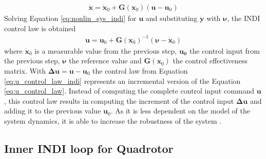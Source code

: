\documentclass[11pt, a4paper, twoside]{report}
\begin{document}
\begin{equation}
	\begin{split}
		\bm{\dot{x}} = \bm{\dot{x}}_0 + \bm{G}(\bm{x}_0) (\bm{u}-\bm{u}_0) 
		\label{eq:nonlin_sys_indi}
	\end{split}
\end{equation}
Solving Equation \ref{eq:nonlin_sys_indi} for $\bm{u}$ and substituting $\bm{\dot{y}}$ with $\bm{\nu}$, the \acrshort{INDI} control law is obtained
\begin{equation}
	\begin{split}
		\bm{u} = \bm{u}_0 + \bm{G}(\bm{x}_0)^{-1} (\bm{\nu} - \bm{\dot{x}}_0)
		\label{eq:u_control_law_indi}
	\end{split}
\end{equation}
where $\bm{\dot{x}}_0$ is a measurable value from the previous step, $\bm{u_0}$ the control input from the previous step, $\bm{\nu}$ the reference value and $\bm{G}(\bm{x}_0)$ the control effectiveness matrix. With $\bm{\Delta u}=\bm{u}-\bm{u}_0$ the control law from Equation \ref{eq:u_control_law_indi} represents an incremental version of the Equation \ref{eq:u_control_law}. Instead of computing the complete control input command $\bm{u}$, this control law results in computing the increment of the control input $\bm{\Delta u}$ and adding it to the previous value $\bm{u}_0$. As it is less dependent on the model of the system dynamics, it is able to increase the robustness of the system \cite{Sieberling}.

\subsection{Inner INDI loop for Quadrotor} \label{subsec: indi_inner}
\end{document}
